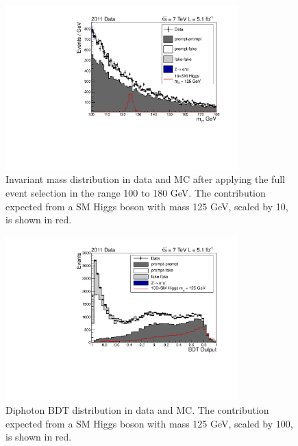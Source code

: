 \begin{figure}[hbt!]
  \includegraphics[width=0.8\textwidth]{hgg7TeV/variablePlots/mass}
 \caption{Invariant mass distribution in data and MC after applying the full event selection in the
 range 100 to 180 GeV. The contribution expected from a SM Higgs boson with mass 125 GeV, scaled by 10, 
 is shown in red. }
 \label{fig:massmcdata}
\end{figure}
\begin{figure}[hbt!]
 \includegraphics[width=0.8\textwidth]{hgg7TeV/variablePlots/bdtoutput}
 \caption{Diphoton BDT distribution in data and MC. The contribution expected from a SM Higgs boson with mass 125 GeV, 
 scaled by 100, is shown in red. }
 \label{fig:diphotonBDT}
\end{figure}

